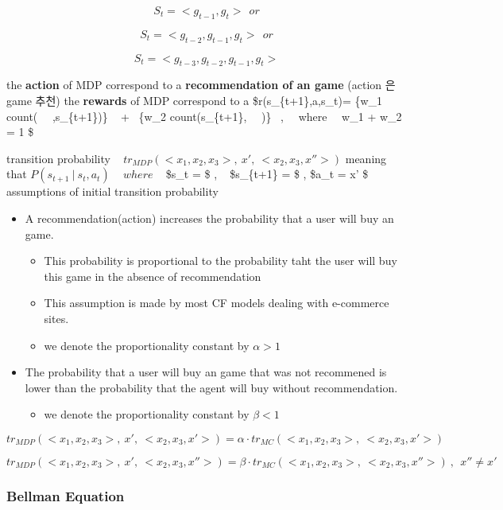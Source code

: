\documentclass[11pt]{article}
\providecommand{\tightlist}{%
      \setlength{\itemsep}{0pt}\setlength{\parskip}{0pt}}
\begin{document}
\[S_t = <g_{t-1}, g_t>\ \ or\]

\[S_t = <g_{t-2}, g_{t-1}, g_t>\ \ or\]

\[S_t = <g_{t-3},g_{t-2}, g_{t-1}, g_t>\]

the \textbf{action} of MDP correspond to a \textbf{recommendation of an
game} (action 은 game 추천) the \textbf{rewards} of MDP correspond to a
\$r(s\_\{t+1\},a,s\_t)= \{w\_1 \times count( ~\cdot ~,s\_\{t+1\})\} ~ +
~\{w\_2 \times count(s\_\{t+1\}, ~\cdot ~)\} ~, ~~where ~~w\_1 + w\_2 =
1 \$

    transition probability ~
\(tr_{MDP}(<x_1, x_2, x_3>, \ x', \ < x_2, x_3,x''>)\) meaning that
\(P( s_{t+1} \ | \ s_t,a_t)\) ~ \(where\) ~ \$s\_t = \$ , ~ \$s\_\{t+1\}
= \$ , \$a\_t = x' \$ assumptions of initial transition probability

\begin{itemize}
\tightlist
\item
  A recommendation(action) increases the probability that a user will
  buy an game.

  \begin{itemize}
  \tightlist
  \item
    This probability is proportional to the probability taht the user
    will buy this game in the absence of recommendation
  \item
    This assumption is made by most CF models dealing with e-commerce
    sites.
  \item
    we denote the proportionality constant by \(\alpha > 1\)
  \end{itemize}
\item
  The probability that a user will buy an game that was not recommened
  is lower than the probability that the agent will buy without
  recommendation.

  \begin{itemize}
  \tightlist
  \item
    we denote the proportionality constant by \(\beta < 1\)
  \end{itemize}
\end{itemize}

\[tr_{MDP}(<x_1, x_2, x_3>, \ x', \ < x_2, x_3,x'>) = \alpha \cdot tr_{MC}(<x_1, x_2, x_3>, \ < x_2, x_3,x'>) \]

\[tr_{MDP}(<x_1, x_2, x_3>, \ x', \ < x_2, x_3,x''>) = \beta \cdot tr_{MC}(<x_1, x_2, x_3>, \ < x_2, x_3,x''>) \ , \ \  x'' \neq x'\]

\subsubsection{Bellman Equation}\label{bellman-equation}
\end{document}

